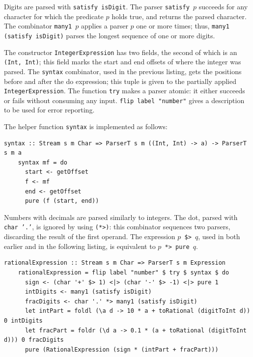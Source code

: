 \documentclass[UdineBachThesis,american,11pt]{PhdThesis}
\begin{document}
  Digits are parsed with \mbox{\texttt{satisfy isDigit}}. The parser
  \mbox{\texttt{satisfy $p$}} succeeds for any character for which the predicate
  $p$ holds true, and returns the parsed character. The combinator
  \mbox{\texttt{many1 $p$}} applies a parser $p$ one or more times; thus,
  \mbox{\texttt{many1 (satisfy isDigit)}} parses the longest sequence of one or
  more digits.

  The constructor \mbox{\texttt{IntegerExpression}} has two fields, the second
  of which is an \mbox{\texttt{(Int, Int)}}; this field marks the start and end
  offsets of where the integer was parsed. The \mbox{\texttt{syntax}}
  combinator, used in the previous listing, gets the positions before and after
  the do expression; this tuple is given to the partially applied
  \mbox{\texttt{IntegerExpression}}. The function \mbox{\texttt{try}} makes a
  parser atomic: it either succeeds or fails without consuming any input.
  \mbox{\texttt{flip label "number"}} gives a description to be used for error
  reporting.

  The helper function \mbox{\texttt{syntax}} is implemented as follows:

  \begin{Verbatim}[gobble=4,fontsize=\small]
    syntax :: Stream s m Char => ParserT s m ((Int, Int) -> a) -> ParserT s m a
    syntax mf = do
      start <- getOffset
      f <- mf
      end <- getOffset
      pure (f (start, end))
  \end{Verbatim}

  Numbers with decimals are parsed similarly to integers. The dot, parsed with
  \mbox{\texttt{char '.'}}, is ignored by using \mbox{\texttt{(*>)}}: this
  combinator sequences two parsers, discarding the result of the first operand.
  The expression \texttt{$p$ \$> $q$}, used in both earlier and in the following
  listing, is equivalent to \mbox{\texttt{$p$ *> pure $q$}}.

  \begin{Verbatim}[gobble=4,fontsize=\small]
    rationalExpression :: Stream s m Char => ParserT s m Expression
    rationalExpression = flip label "number" $ try $ syntax $ do
      sign <- (char '+' $> 1) <|> (char '-' $> -1) <|> pure 1
      intDigits <- many1 (satisfy isDigit)
      fracDigits <- char '.' *> many1 (satisfy isDigit)
      let intPart = foldl (\a d -> 10 * a + toRational (digitToInt d)) 0 intDigits
      let fracPart = foldr (\d a -> 0.1 * (a + toRational (digitToInt d))) 0 fracDigits
      pure (RationalExpression (sign * (intPart + fracPart)))
  \end{Verbatim}
\end{document}
